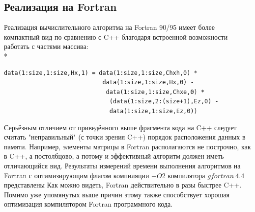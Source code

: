 \documentclass[10pt]{article}
\begin{document}
\subsection{Реализация на Fortran}
Реализация вычислительного алгоритма на Fortran 90/95 имеет более компактный
вид по сравнению с C++ благодаря встроенной возможности работать с частями
массива:\\*
\begin{verbatim}
data(1:size,1:size,Hx,1) = data(1:size,1:size,Chxh,0) * 
                            data(1:size,1:size,Hx,0) -
                             data(1:size,1:size,Chxe,0) *
                              (data(1:size,2:(size+1),Ez,0) -
                              data(1:size,1:size,Ez,0))
\end{verbatim}
Серьёзным отличием от приведённого выше фрагмента кода на C++ следует считать 
"неправильный" (с точки зрения C++) порядок расположения данных в памяти.
Например, элементы матрицы в Fortran располагаются не построчно, как в C++,
а постолбцово, а потому и эффективный алгоритм должен иметь отличающийся вид.
Результаты измерений времени выполнения алгоритмов на Fortran
с оптимизирующим флагом компиляции $-O2$ компилятора $gfortran~4.4$ представлены
Как можно видеть, Fortran действительно в разы быстрее C++.
Помимо уже упомянутых выше причин этому также способствует хорошая
оптимизация компилятором Fortran программного кода.
\end{document}
